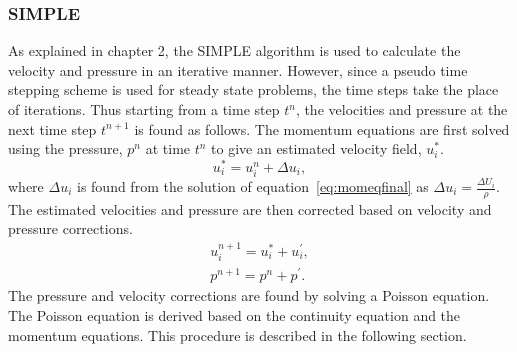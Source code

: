 \subsubsection{SIMPLE}
As explained in chapter 2, the SIMPLE algorithm is used to calculate the velocity and pressure in an iterative manner. However, since a pseudo time stepping scheme is used for steady state problems, the time steps take the place of iterations. Thus starting from a time step $t^n$, the velocities and pressure at the next time step $t^{n+1}$ is found as follows. The momentum equations are first solved using the pressure, $p^{n}$ at time $t^n$ to give an estimated velocity field, $u_{i}^{\ast}$. 
\begin{equation}
u_{i}^{\ast} = u_{i}^{n} + \Delta u_{i},
\end{equation}
where $\Delta u_{i}$ is found from the solution of equation~\ref{eq:momeqfinal} as $\Delta u_{i} = \frac{\Delta U_{i}}{\rho}$. 
The estimated velocities and pressure are then corrected based on velocity and pressure corrections.
\begin{align}
u_i^{n+1} = u_i^{\ast} + u_i^{\prime},\label{eq:vcorr}\\
p^{n+1} = p^n + p^{\prime}.
\label{eq:pcorr}
\end{align}
The pressure and velocity corrections are found by solving a Poisson equation. The Poisson equation is derived based on the continuity equation and the momentum equations. This procedure is described in the following section.

